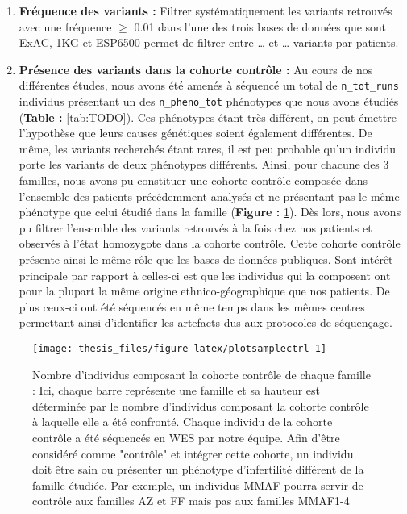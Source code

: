 \documentclass[12pt,twoside]{reedthesis}
\theoremstyle{definition}
\theoremstyle{definition}
\theoremstyle{remark}
\begin{document}
  \begin{enumerate}
  \def\labelenumi{\arabic{enumi}.}
  \setcounter{enumi}{4}
  \item
    \textbf{Fréquence des variants :} Filtrer systématiquement les
    variants retrouvés avec une fréquence \(\ge\) 0.01 dans l'une des
    trois bases de données que sont ExAC, 1KG et ESP6500 permet de filtrer
    entre \ldots{} et \ldots{} variants par patients.
  \item
    \textbf{Présence des variants dans la cohorte contrôle :} Au cours de
    nos différentes études, nous avons été amenés à séquencé un total de
    \texttt{n\_tot\_runs} individus présentant un des
    \texttt{n\_pheno\_tot} phénotypes que nous avons étudiés
    (\textbf{Table : }\ref{tab:TODO}). Ces phénotypes étant très
    différent, on peut émettre l'hypothèse que leurs causes génétiques
    soient également différentes. De même, les variants recherchés étant
    rares, il est peu probable qu'un individu porte les variants de deux
    phénotypes différents. Ainsi, pour chacune des 3 familles, nous avons
    pu constituer une cohorte contrôle composée dans l'ensemble des
    patients précédemment analysés et ne présentant pas le même phénotype
    que celui étudié dans la famille (\textbf{Figure :}
    \ref{fig:plotsamplectrl}). Dès lors, nous avons pu filtrer l'ensemble
    des variants retrouvés à la fois chez nos patients et observés à
    l'état homozygote dans la cohorte contrôle. Cette cohorte contrôle
    présente ainsi le même rôle que les bases de données publiques. Sont
    intérêt principale par rapport à celles-ci est que les individus qui
    la composent ont pour la plupart la même origine ethnico-géographique
    que nos patients. De plus ceux-ci ont été séquencés en même temps dans
    les mêmes centres permettant ainsi d'identifier les artefacts dus aux
    protocoles de séquençage.
  \end{enumerate}
  
  \begin{figure}
  
  {\centering \texttt{[image: thesis\_files/figure-latex/plotsamplectrl-1]} 
  
  }
  
  \caption[Nombre d'individus composant la cohorte contrôle de chaque famille]{Nombre d'individus composant la cohorte contrôle de chaque famille : Ici, chaque barre représente une famille et sa hauteur est déterminée par le nombre d'individus composant la cohorte contrôle à laquelle elle a été confronté. Chaque individu de la cohorte contrôle a été séquencés en WES par notre équipe. Afin d'être considéré comme "contrôle" et intégrer cette cohorte, un individu doit être sain ou présenter un phénotype d'infertilité différent de la famille étudiée. Par exemple, un individus MMAF pourra servir de contrôle aux familles AZ et FF mais pas aux familles MMAF1-4}\label{fig:plotsamplectrl}
  \end{figure}
  
\end{document}
